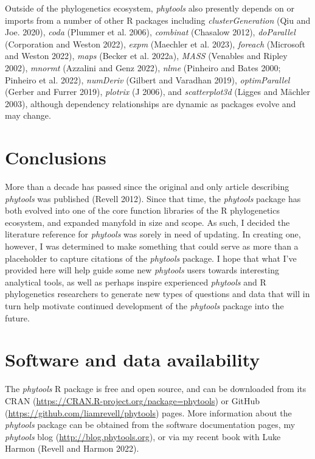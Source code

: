 \documentclass[fleqn,10pt,lineno]{wlpeerj} %
\begin{document}
Outside of the phylogenetics ecosystem, \emph{phytools} also presently depends on or imports from a number of other R packages including \emph{clusterGeneration} (Qiu and Joe. 2020), \emph{coda} (Plummer et al. 2006), \emph{combinat} (Chasalow 2012), \emph{doParallel} (Corporation and Weston 2022), \emph{expm} (Maechler et al. 2023), \emph{foreach} (Microsoft and Weston 2022), \emph{maps} (Becker et al. 2022a), \emph{MASS} (Venables and Ripley 2002), \emph{mnormt} (Azzalini and Genz 2022), \emph{nlme} (Pinheiro and Bates 2000; Pinheiro et al. 2022), \emph{numDeriv} (Gilbert and Varadhan 2019), \emph{optimParallel} (Gerber and Furrer 2019), \emph{plotrix} (J 2006), and \emph{scatterplot3d} (Ligges and Mächler 2003), although dependency relationships are dynamic as packages evolve and may change.

\hypertarget{conclusions}{%
\section{Conclusions}\label{conclusions}}

More than a decade has passed since the original and only article describing \emph{phytools} was published (Revell 2012). Since that time, the \emph{phytools} package has both evolved into one of the core function libraries of the R phylogenetics ecosystem, and expanded manyfold in size and scope. As such, I decided the literature reference for \emph{phytools} was sorely in need of updating. In creating one, however, I was determined to make something that could serve as more than a placeholder to capture citations of the \emph{phytools} package. I hope that what I've provided here will help guide some new \emph{phytools} users towards interesting analytical tools, as well as perhaps inspire experienced \emph{phytools} and R phylogenetics researchers to generate new types of questions and data that will in turn help motivate continued development of the \emph{phytools} package into the future.

\hypertarget{software-and-data-availability}{%
\section{Software and data availability}\label{software-and-data-availability}}

The \emph{phytools} R package is free and open source, and can be downloaded from its CRAN (\url{https://CRAN.R-project.org/package=phytools}) or GitHub (\url{https://github.com/liamrevell/phytools}) pages. More information about the \emph{phytools} package can be obtained from the software documentation pages, my \emph{phytools} blog (\url{http://blog.phytools.org}), or via my recent book with Luke Harmon (Revell and Harmon 2022).
\end{document}
